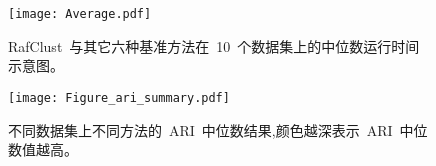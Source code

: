    
  \begin{figure}[!htbp]
    \centering
    \texttt{[image: Average.pdf]}
    \caption{
    RafClust~与其它六种基准方法在~10~个数据集上的中位数运行时间示意图。
    }
    \label{fig:running-summary}
\end{figure}

\begin{figure}[!htbp]
    \centering
    \texttt{[image: Figure\_ari\_summary.pdf]}
    \caption{
    不同数据集上不同方法的~ARI~中位数结果,颜色越深表示~ARI~中位数值越高。
    }
    \label{fig:rafari}
\end{figure}


